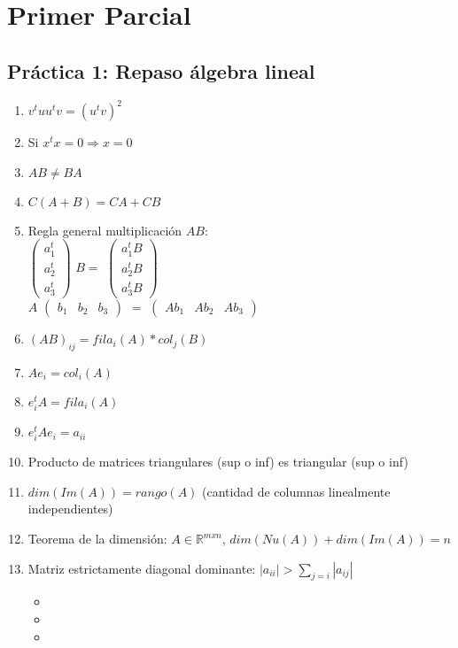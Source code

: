 \section*{Primer Parcial}
\subsection*{Práctica 1: Repaso álgebra lineal}
\begin{enumerate}
    \item $v^tuu^tv = (u^tv)^2$
    \item Si $x^tx=0 \Rightarrow x = 0$
    \item {$AB \neq BA$}
    \item $C(A+B) = CA + CB$
    \item Regla general multiplicación $AB$: \\
    $ \begin{pmatrix}
a_1^t \\
a_2^t \\
a_3^t 
\end{pmatrix}$ $B = $ $\begin{pmatrix}
a_1^t B \\
a_2^tB \\
a_3^tB 
\end{pmatrix} $ \\
\linebreak
$A$ $ \begin{pmatrix}
b_1 & b_2 & b_3 
\end{pmatrix} $   $=$ $\begin{pmatrix}
Ab_1 & Ab_2 & Ab_3 
\end{pmatrix}  $
    \item $(AB)_{ij} = fila_i(A)*col_j(B)$
    \item $Ae_{i} = col_i(A)$
    \item $e_i^tA = fila_i(A)$
    \item $e_i^tAe_i = a_{ii}$
    \item Producto de matrices triangulares (sup o inf) es triangular (sup o inf)
    \item $dim(Im(A)) = rango(A)$ (cantidad de columnas linealmente independientes)
    \item Teorema de la dimensión: $A \in \mathbb{R}^{mxn}$, $dim(Nu(A)) + dim(Im(A)) = n$
    \item Matriz estrictamente diagonal dominante: $|a_{ii}| > \sum_{j=i}{}|a_{ij}|$
    \begin{itemize}
    \item {}
	\item {}
	\item {}


\end{itemize}
\end{enumerate}
